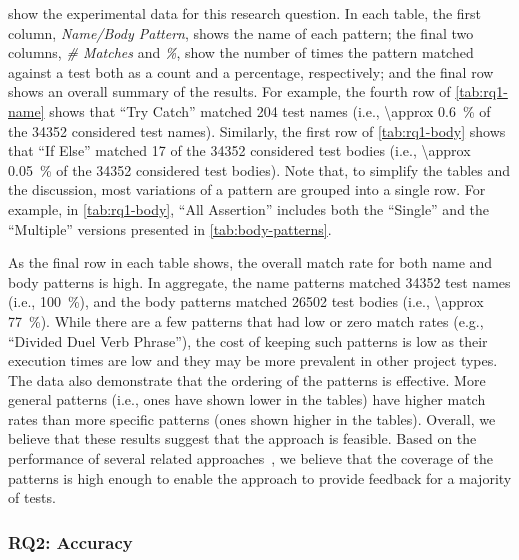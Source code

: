  show the experimental data for this research question.
% 
In each table, the first column, \emph{Name\slash Body Pattern}, shows the name of each pattern; the final two columns, \emph{\# Matches} and \emph{\%}, show the number of times the pattern matched against a test both as a count and a percentage, respectively; and the final row shows an overall summary of the results.
%
For example, the fourth row of \cref{tab:rq1-name} shows that \enquote{Try Catch} matched \num{204} test names (i.e., \SI{\approx 0.6}{\percent} of the \num{34352} considered test names).
%
Similarly, the first row of \cref{tab:rq1-body} shows that \enquote{If Else} matched \num{17} of the \num{34352} considered test bodies (i.e., \SI{\approx 0.05}{\percent} of the \num{34352} considered test bodies).
% 
Note that, to simplify the tables and the discussion, most variations of a pattern are grouped into a single row.  For example, in \cref{tab:rq1-body}, \enquote{All Assertion} includes both the \enquote{Single} and the \enquote{Multiple} versions presented in \cref{tab:body-patterns}.


As the final row in each table shows, the overall match rate for both name and body patterns is high.
%
In aggregate, the name patterns matched \num{34352} test names (i.e., \SI{100}{\percent}), and the body patterns matched \num{26502} test bodies (i.e., \SI{\approx 77}{\percent}).
%
While there are a few patterns that had low or zero match rates (e.g., \enquote{Divided Duel Verb Phrase}), the cost of keeping such patterns is low as their execution times are low and they may be more prevalent in other project types.
%
The data also demonstrate that the ordering of the patterns is effective.
%
More general patterns (i.e., ones have shown lower in the tables) have higher match rates than more specific patterns (ones shown higher in the tables).
%
Overall, we believe that these results suggest that the approach is feasible.
Based on the performance of several related approaches~\cite{host2009debugging,host2008java,zhong2013detecting,singer2008exploiting,allamanis2014learning}, we believe that the coverage of the patterns is high enough to enable the approach to provide feedback for a majority of tests.


\subsubsection{RQ2: Accuracy}
\label{sec:evaluation:accuracy}



